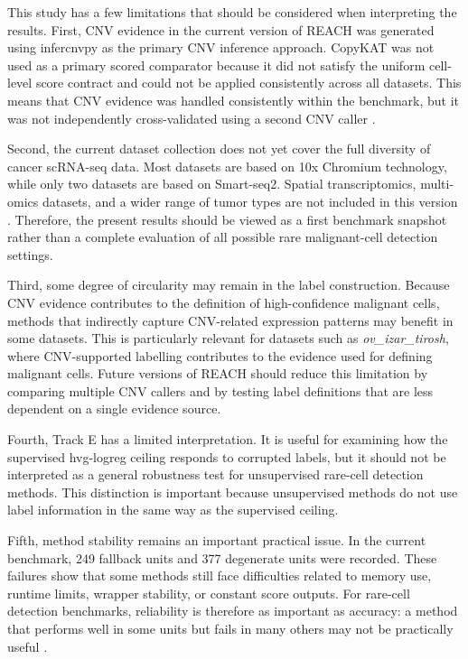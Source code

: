 \documentclass[10pt]{article}
\begin{document}
This study has a few limitations that should be considered when interpreting the results. First, CNV evidence in the current version of REACH was generated using infercnvpy as the primary CNV inference approach. CopyKAT was not used as a primary scored comparator because it did not satisfy the uniform cell-level score contract and could not be applied consistently across all datasets. This means that CNV evidence was handled consistently within the benchmark, but it was not independently cross-validated using a second CNV caller \cite{chen2025benchmarking,gao2021delineating}.

Second, the current dataset collection does not yet cover the full diversity of cancer scRNA-seq data. Most datasets are based on 10x Chromium technology, while only two datasets are based on Smart-seq2. Spatial transcriptomics, multi-omics datasets, and a wider range of tumor types are not included in this version \cite{jovic2022single}. Therefore, the present results should be viewed as a first benchmark snapshot rather than a complete evaluation of all possible rare malignant-cell detection settings.

Third, some degree of circularity may remain in the label construction. Because CNV evidence contributes to the definition of high-confidence malignant cells, methods that indirectly capture CNV-related expression patterns may benefit in some datasets. This is particularly relevant for datasets such as \textit{ov\_izar\_tirosh}, where CNV-supported labelling contributes to the evidence used for defining malignant cells. Future versions of REACH should reduce this limitation by comparing multiple CNV callers and by testing label definitions that are less dependent on a single evidence source.

Fourth, Track E has a limited interpretation. It is useful for examining how the supervised hvg-logreg ceiling responds to corrupted labels, but it should not be interpreted as a general robustness test for unsupervised rare-cell detection methods. This distinction is important because unsupervised methods do not use label information in the same way as the supervised ceiling.

Fifth, method stability remains an important practical issue. In the current benchmark, 249 fallback units and 377 degenerate units were recorded. These failures show that some methods still face difficulties related to memory use, runtime limits, wrapper stability, or constant score outputs. For rare-cell detection benchmarks, reliability is therefore as important as accuracy: a method that performs well in some units but fails in many others may not be practically useful \cite{tran2020benchmark,everingham2010pascal}.
\end{document}
